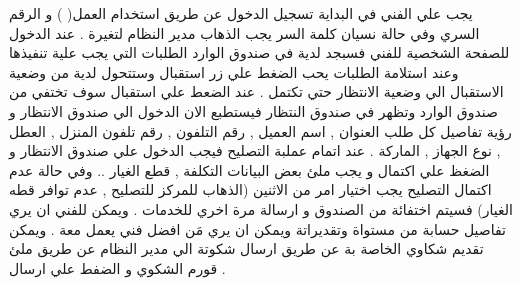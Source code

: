 \documentclass[25pt]{article}
\begin{document}
\begin{itemize}
	يجب علي الفني في البداية تسجيل الدخول عن طريق استخدام                العمل( ) و الرقم السري وفي حالة نسيان كلمة السر يجب الذهاب مدير النظام لتغيرة .
	\newline
	عند الدخول للصفحة الشخصية للفني فسبجد لدية في صندوق الوارد الطلبات التي يجب علية تنفيذها وعند استلامة الطلبات يحب الضغط علي زر استقبال وستتحول لدية من وضعية الاستقبال الي وضعية الانتظار حتي تكتمل .
	\newline
	عند الضعط علي استقبال سوف تختفي من صندوق الوارد وتظهر في صندوق النتظار فيستطبع الان الدخول الي صندوق الانتظار و رؤية تفاصيل كل طلب { العنوان , اسم العميل , رقم التلفون , رقم تلفون المنزل , العطل , نوع الجهاز , الماركة } .
	\newline
	عند اتمام عملبة التصليح فيجب الدخول علي صندوق الانتظار و الضغظ علي اكتمال و يجب ملئ بعض البيانات {التكلفة , قطع الغيار} .. وفي حالة عدم اكتمال التصليح يجب اختيار امر من الاثنين (الذهاب للمركز للتصليح , عدم توافر قطه الغيار) فسيتم اختفائة من الصندوق و ارسالة مرة اخري للخدمات .
	\newline
	ويمكن للفني ان يري تفاصيل حسابة من مستواة وتقديراتة ويمكن ان يري مَن افضل فني يعمل معة .
	\newline
	ويمكن تقديم شكاوي الخاصة بة عن طريق ارسال شكوتة الي مدير النظام عن طريق ملئ قورم الشكوي و الضفط علي ارسال .
	\newline
	\newline 
	

\end{itemize}
\end{document}
